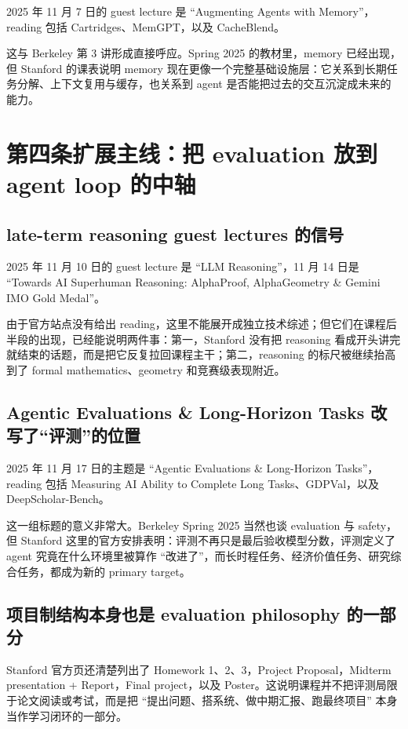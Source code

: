 2025 年 11 月 7 日的 guest lecture 是 ``Augmenting Agents with Memory''，reading 包括 Cartridges、MemGPT，以及 CacheBlend。

这与 Berkeley 第 3 讲形成直接呼应。Spring 2025 的教材里，memory 已经出现，但 Stanford 的课表说明 memory 现在更像一个完整基础设施层：它关系到长期任务分解、上下文复用与缓存，也关系到 agent 是否能把过去的交互沉淀成未来的能力。

\section{第四条扩展主线：把 evaluation 放到 agent loop 的中轴}

\subsection{late-term reasoning guest lectures 的信号}

2025 年 11 月 10 日的 guest lecture 是 ``LLM Reasoning''，11 月 14 日是 ``Towards AI Superhuman Reasoning: AlphaProof, AlphaGeometry \& Gemini IMO Gold Medal''。

由于官方站点没有给出 reading，这里不能展开成独立技术综述；但它们在课程后半段的出现，已经能说明两件事：第一，Stanford 没有把 reasoning 看成开头讲完就结束的话题，而是把它反复拉回课程主干；第二，reasoning 的标尺被继续抬高到了 formal mathematics、geometry 和竞赛级表现附近。

\subsection{Agentic Evaluations \& Long-Horizon Tasks 改写了“评测”的位置}

2025 年 11 月 17 日的主题是 ``Agentic Evaluations \& Long-Horizon Tasks''，reading 包括 Measuring AI Ability to Complete Long Tasks、GDPVal，以及 DeepScholar-Bench。

这一组标题的意义非常大。Berkeley Spring 2025 当然也谈 evaluation 与 safety，但 Stanford 这里的官方安排表明：评测不再只是最后验收模型分数，评测定义了 agent 究竟在什么环境里被算作 ``改进了''，而长时程任务、经济价值任务、研究综合任务，都成为新的 primary target。

\subsection{项目制结构本身也是 evaluation philosophy 的一部分}

Stanford 官方页还清楚列出了 Homework 1、2、3，Project Proposal，Midterm presentation + Report，Final project，以及 Poster。这说明课程并不把评测局限于论文阅读或考试，而是把 ``提出问题、搭系统、做中期汇报、跑最终项目'' 本身当作学习闭环的一部分。


